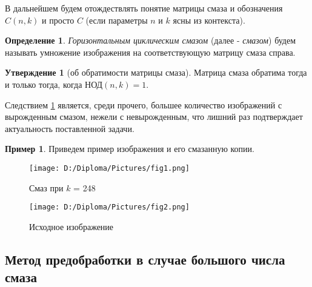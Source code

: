 \documentclass[a4paper]{article}
\theoremstyle{definition}
\newtheorem{statement}{Утверждение}[section]
\newtheorem{definition}{Определение}[section]
\newtheorem*{example}{Пример}
\begin{document}
    В дальнейшем будем отождествлять понятие матрицы смаза и обозначения $C(n, k)$ и просто $C$ (если параметры $n$ и $k$ ясны из контекста).
\vspace{0.3cm}


    \begin{definition}
    \label{blur}
	\emph{Горизонтальным циклическим смазом} (далее - \emph{смазом}) будем называть умножение изображения на соответствующую матрицу смаза справа.
    \end{definition}


    \begin{statement}[об обратимости матрицы смаза]
    \label{inverse}
	Матрица смаза обратима тогда и только тогда, когда НОД$(n, k) = 1$.
    \end{statement}


    Следствием \ref{inverse} является, среди прочего, большее количество изображений с вырожденным смазом, нежели с невырожденным, что лишний раз подтверждает актуальность поставленной задачи.


    \begin{example}
    Приведем пример изображения и его смазанную копии.

\begin{minipage}{70mm}
    \begin{figure}[H]
            \texttt{[image: D:/Diploma/Pictures/fig1.png]}
            \label{Fig1}
            \caption[Смаз при $k$ = 248]{Смаз при $k$ = 248}
        \end{figure}
\end{minipage}
\hfill
\begin{minipage}{70mm}
  \begin{figure}[H]
            \texttt{[image: D:/Diploma/Pictures/fig2.png]}
            \label{Fig2}
            \caption[Исходное изображение]{Исходное изображение}
        \end{figure}
\end{minipage}
\hfill

    \end{example}

    \newpage


    \begin{center}
        \section*{Метод предобработки в случае большого числа смаза}
    \end{center}
\end{document}
